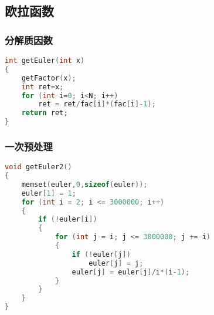 \subsection{欧拉函数}
    \subsubsection{分解质因数}
	\begin{lstlisting}[language=c++]
int getEuler(int x)
{
    getFactor(x);
    int ret=x;
    for (int i=0; i<N; i++)
        ret = ret/fac[i]*(fac[i]-1);
    return ret;
}
	\end{lstlisting}

    \subsubsection{一次预处理}
	\begin{lstlisting}[language=c++]
void getEuler2()
{
    memset(euler,0,sizeof(euler));
    euler[1] = 1;
    for (int i = 2; i <= 3000000; i++)
    {
        if (!euler[i])
        {
            for (int j = i; j <= 3000000; j += i)
            {
                if (!euler[j])
                    euler[j] = j;
                euler[j] = euler[j]/i*(i-1);
            }
        }
    }
}
	\end{lstlisting}